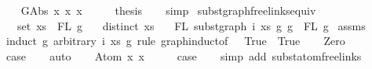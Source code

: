 \begin{isabellebody}
\isanewline
\ \ \isamarkupfalse%
\ {\isacharparenleft}{\kern0pt}GAbs\ x{}{}\ x{}{}\ x{}{}{\isacharparenright}{\kern0pt}\isanewline
\ \ \isamarkupfalse%
\ \isamarkupfalse%
\ {\isacharquery}{\kern0pt}thesis\isanewline
\ \ \isamarkupfalse%
\ simp\isanewline
{}\isamarkupfalse%
%
\endisatagproof
{\isafoldproof}%
%
\isadelimproof
\isanewline
%
\endisadelimproof
\isanewline
\isanewline
{}\isamarkupfalse%
\ subst{\isacharunderscore}{\kern0pt}graph{\isacharunderscore}{\kern0pt}freelinks{\isacharunderscore}{\kern0pt}equiv{\isacharcolon}{\kern0pt}\isanewline
\ \ \ {\isachardoublequoteopen}set\ xs\ {\isacharequal}{\kern0pt}\ FL\ g{}{\isachardoublequoteclose}\isanewline
\ \ \ {\isachardoublequoteopen}distinct\ xs{\isachardoublequoteclose}\isanewline
\ \ \ {\isachardoublequoteopen}FL\ {\isacharparenleft}{\kern0pt}subst{\isacharunderscore}{\kern0pt}graph\ i\ xs\ g{}\ g{\isacharparenright}{\kern0pt}\ {\isacharequal}{\kern0pt}\ FL\ g{\isachardoublequoteclose}\isanewline
%
\isadelimproof
%
\endisadelimproof
%
\isatagproof
{}\isamarkupfalse%
\ assms\isanewline
{}\isamarkupfalse%
\ {\isacharparenleft}{\kern0pt}induct\ g\ arbitrary{\isacharcolon}{\kern0pt}\ i\ xs\ g{}\ rule{\isacharcolon}{\kern0pt}\ graph{\isachardot}{\kern0pt}induct{\isacharbrackleft}{\kern0pt}of\ {\isacharunderscore}{\kern0pt}\ {\isachardoublequoteopen}{\isacharpercent}{\kern0pt}{\isacharunderscore}{\kern0pt}{\isachardot}{\kern0pt}\ True{\isachardoublequoteclose}\ {\isachardoublequoteopen}{\isacharpercent}{\kern0pt}{\isacharunderscore}{\kern0pt}{\isachardot}{\kern0pt}\ True{\isachardoublequoteclose}{\isacharbrackright}{\kern0pt}{\isacharparenright}{\kern0pt}\isanewline
\ \ \isamarkupfalse%
\ Zero\isanewline
\ \ \isamarkupfalse%
\ \isamarkupfalse%
\ {\isacharquery}{\kern0pt}case\isanewline
\ \ \isamarkupfalse%
\ auto\isanewline
{}\isamarkupfalse%
\isanewline
\ \ \isamarkupfalse%
\ {\isacharparenleft}{\kern0pt}Atom\ x{}\ x{}{\isacharparenright}{\kern0pt}\isanewline
\ \ \isamarkupfalse%
\ \isamarkupfalse%
\ {\isacharquery}{\kern0pt}case\isanewline
\ \ \isamarkupfalse%
\ {\isacharparenleft}{\kern0pt}simp\ add{\isacharcolon}{\kern0pt}\ subst{\isacharunderscore}{\kern0pt}atom{\isacharunderscore}{\kern0pt}freelinks{\isacharparenright}{\kern0pt}\isanewline

\end{isabellebody}
